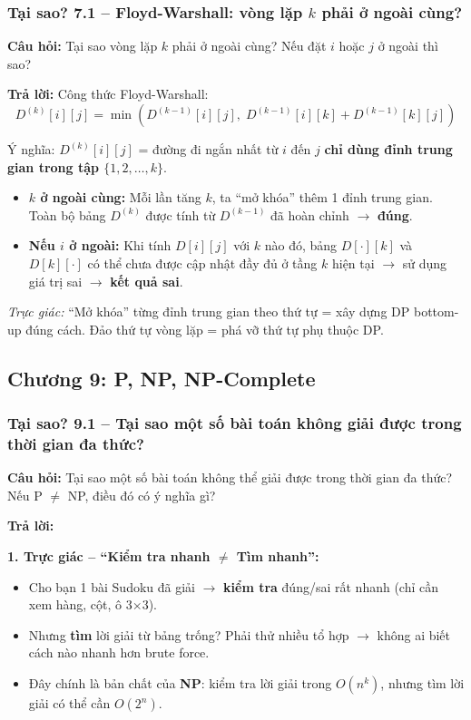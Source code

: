 \documentclass[10pt]{article}
\begin{document}
\subsubsection{Tại sao? 7.1 -- Floyd-Warshall: vòng lặp $k$ phải ở ngoài cùng?}\label{whyans:7.1}

\textbf{Câu hỏi:} Tại sao vòng lặp $k$ phải ở ngoài cùng? Nếu đặt $i$ hoặc $j$ ở ngoài thì sao?

\textbf{Trả lời:} Công thức Floyd-Warshall:
\[
D^{(k)}[i][j] = \min\left(D^{(k-1)}[i][j], \; D^{(k-1)}[i][k] + D^{(k-1)}[k][j]\right)
\]

Ý nghĩa: $D^{(k)}[i][j]$ = đường đi ngắn nhất từ $i$ đến $j$ \textbf{chỉ dùng đỉnh trung gian trong tập $\{1, 2, \ldots, k\}$}.

\begin{itemize}
\item \textbf{$k$ ở ngoài cùng:} Mỗi lần tăng $k$, ta ``mở khóa'' thêm 1 đỉnh trung gian. Toàn bộ bảng $D^{(k)}$ được tính từ $D^{(k-1)}$ đã hoàn chỉnh $\to$ \textbf{đúng}.
\item \textbf{Nếu $i$ ở ngoài:} Khi tính $D[i][j]$ với $k$ nào đó, bảng $D[\cdot][k]$ và $D[k][\cdot]$ có thể chưa được cập nhật đầy đủ ở tầng $k$ hiện tại $\to$ sử dụng giá trị sai $\to$ \textbf{kết quả sai}.
\end{itemize}

\textit{Trực giác:} ``Mở khóa'' từng đỉnh trung gian theo thứ tự = xây dựng DP bottom-up đúng cách. Đảo thứ tự vòng lặp = phá vỡ thứ tự phụ thuộc DP.

\subsection{Chương 9: P, NP, NP-Complete}

\subsubsection{Tại sao? 9.1 -- Tại sao một số bài toán không giải được trong thời gian đa thức?}\label{whyans:9.1}

\textbf{Câu hỏi:} Tại sao một số bài toán không thể giải được trong thời gian đa thức? Nếu P $\neq$ NP, điều đó có ý nghĩa gì?

\textbf{Trả lời:}

\textbf{1. Trực giác -- ``Kiểm tra nhanh $\neq$ Tìm nhanh'':}
\begin{itemize}
\item Cho bạn 1 bài Sudoku đã giải $\to$ \textbf{kiểm tra} đúng/sai rất nhanh (chỉ cần xem hàng, cột, ô 3$\times$3).
\item Nhưng \textbf{tìm} lời giải từ bảng trống? Phải thử nhiều tổ hợp $\to$ không ai biết cách nào nhanh hơn brute force.
\item Đây chính là bản chất của \textbf{NP}: kiểm tra lời giải trong $O(n^k)$, nhưng tìm lời giải có thể cần $O(2^n)$.
\end{itemize}
\end{document}
